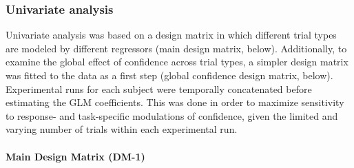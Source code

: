 \documentclass[12pt,twoside]{reedthesis}
\begin{document}
\hypertarget{univariate-analysis}{%
\subsubsection*{Univariate analysis}\label{univariate-analysis}}

Univariate analysis was based on a design matrix in which different trial types are modeled by different regressors (main design matrix, below). Additionally, to examine the global effect of confidence across trial types, a simpler design matrix was fitted to the data as a first step (global confidence design matrix, below). Experimental runs for each subject were temporally concatenated before estimating the GLM coefficients. This was done in order to maximize sensitivity to response- and task-specific modulations of confidence, given the limited and varying number of trials within each experimental run.

\hypertarget{DM-1}{%
\paragraph{Main Design Matrix (DM-1)}\label{DM-1}}
\end{document}
